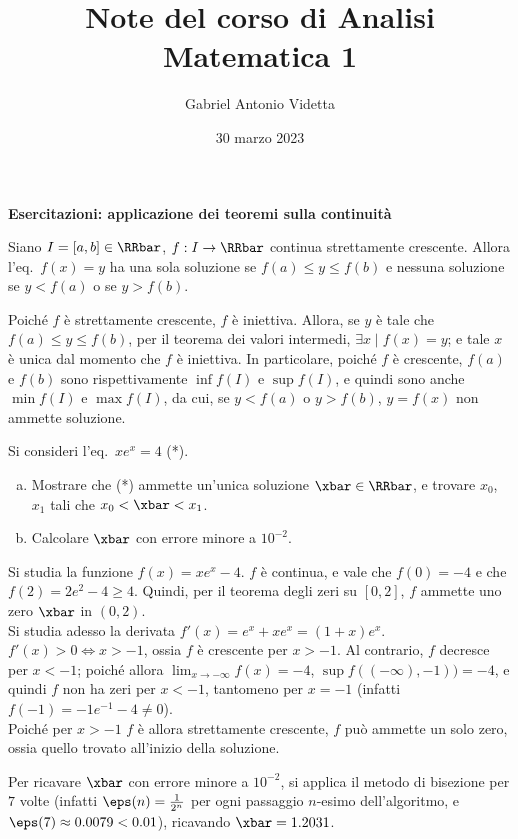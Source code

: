\documentclass[11pt]{article}
\title{\textbf{Note del corso di Analisi Matematica 1}}
\author{Gabriel Antonio Videtta}
\date{30 marzo 2023}
\begin{document}
	
	\maketitle
	
	\begin{center}
		\Large \textbf{Esercitazioni: applicazione dei teoremi sulla continuità}
	\end{center}

	\begin{exercise}
		Siano $I = [a, b] \in \RRbar$, $f : I \to \RRbar$ continua strettamente
		crescente. Allora l'eq.~$f(x)=y$ ha una sola soluzione se 
		$f(a) \leq y \leq f(b)$ e nessuna soluzione se $y < f(a)$ o
		se $y > f(b)$.
	\end{exercise}
	
	\begin{solution}
		Poiché $f$ è strettamente crescente, $f$ è iniettiva. Allora,
		se $y$ è tale che $f(a) \leq y \leq f(b)$, per il teorema
		dei valori intermedi, $\exists x \mid f(x) = y$; e tale $x$
		è unica dal momento che $f$ è iniettiva. In particolare, poiché $f$ è crescente,
		$f(a)$ e $f(b)$ sono rispettivamente $\inf f(I)$ e $\sup f(I)$, e
		quindi sono anche
		$\min f(I)$ e $\max f(I)$, da cui, se $y < f(a)$ o $y > f(b)$,
		$y=f(x)$ non ammette soluzione.
	\end{solution}

	\begin{exercise}
		Si consideri l'eq.~$xe^x = 4$ (*).
		
		\begin{enumerate}[(a)]
			\item Mostrare che (*) ammette un'unica soluzione $\xbar \in \RRbar$, e trovare $x_0$, $x_1$ tali che $x_0 < \xbar < x_1$.
			\item Calcolare $\xbar$ con errore minore a $10^{-2}$.
		\end{enumerate}		
	\end{exercise}

	\begin{solution}
		Si studia la funzione $f(x) = xe^x - 4$. $f$ è continua, e vale che
		$f(0) = -4$ e che $f(2) = 2e^2 - 4 \geq 4$. Quindi, per il teorema
		degli zeri su $[0, 2]$, $f$ ammette uno zero $\xbar$ in $(0, 2)$. \\
		
		Si studia adesso la derivata $f'(x) = e^x + xe^x = (1+x)e^x$.
		$f'(x) > 0 \iff x > -1$, ossia $f$ è crescente per $x > -1$.
		Al contrario, $f$ decresce per $x < -1$; poiché allora
		$\lim_{x \to -\infty} f(x) = -4$, $\sup f((-\infty), -1)) = -4$,
		e quindi $f$ non ha zeri per $x < -1$, tantomeno per $x = -1$
		(infatti $f(-1) = -1 e^{-1} - 4 \neq 0$). \\
		
		Poiché per $x > -1$ $f$ è allora strettamente crescente,
		$f$ può ammette un solo zero, ossia quello trovato all'inizio
		della soluzione.
		
		Per ricavare $\xbar$ con errore minore a $10^{-2}$, si applica
		il metodo di bisezione per $7$ volte (infatti $\eps(n) = \frac{1}{2^n}$
		per ogni passaggio $n$-esimo dell'algoritmo, e $\eps(7) \approx 0.0079 < 0.01$), ricavando $\xbar = 1.2031$.
	\end{solution}
\end{document}
